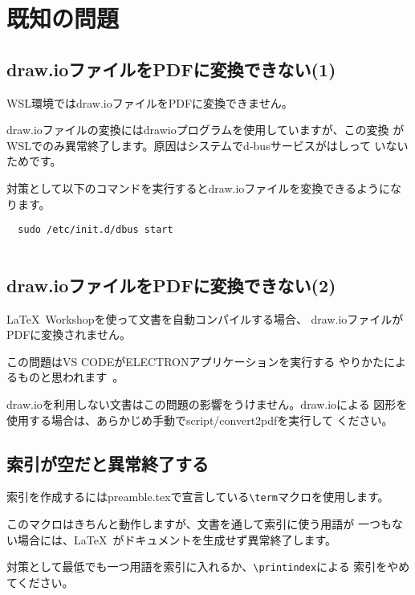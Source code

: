 \chapter{既知の問題}
\label{sec:appendix10}

\section{draw.ioファイルをPDFに変換できない(1)}
WSL環境ではdraw.ioファイルをPDFに変換できません。

draw.ioファイルの変換にはdrawioプログラムを使用していますが、この変換
がWSLでのみ異常終了します。原因はシステムでd-busサービスがはしって
いないためです。

対策として以下のコマンドを実行するとdraw.ioファイルを変換できるようになります。

\begin{lstlisting}
  sudo /etc/init.d/dbus start
  
\end{lstlisting}

\section{draw.ioファイルをPDFに変換できない(2)}
\LaTeX\ Workshopを使って文書を自動コンパイルする場合、
draw.ioファイルがPDFに変換されません。

この問題はVS CODEがELECTRONアプリケーションを実行する
やりかたによるものと思われます~\cite{ELECTRON_RUN_AS_NODE}。

draw.ioを利用しない文書はこの問題の影響をうけません。draw.ioによる
図形を使用する場合は、あらかじめ手動でscript/convert2pdfを実行して
ください。

\section{索引が空だと異常終了する}
索引を作成するにはpreamble.texで宣言している\lstinline{\term}マクロを使用します。

このマクロはきちんと動作しますが、文書を通して索引に使う用語が
一つもない場合には、\LaTeX\ がドキュメントを生成せず異常終了します。

対策として最低でも一つ用語を索引に入れるか、\lstinline{\printindex}による
索引をやめてください。

